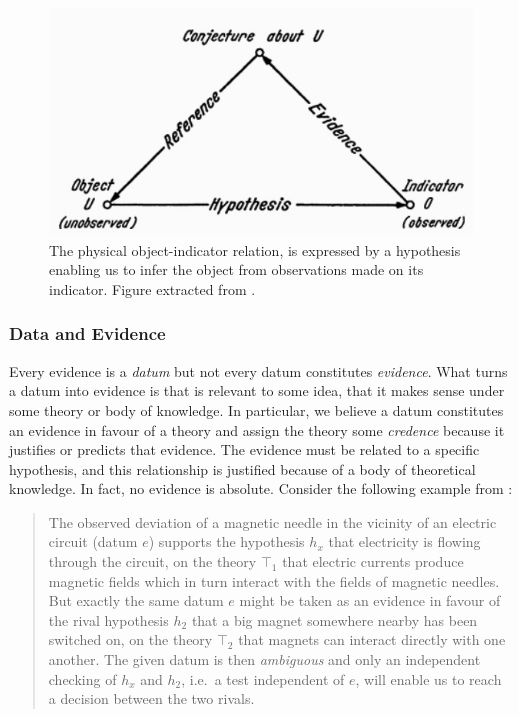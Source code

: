 \documentclass[
]{book}
\begin{document}
\begin{figure}

{\centering \includegraphics[width=0.5\linewidth]{Figures/indicator} 

}

\caption{The physical object-indicator relation, is expressed by a hypothesis enabling us to infer the object from observations made on its indicator. Figure extracted from \citep{bunge2017philosophy}.}\label{fig:indicator}
\end{figure}

\hypertarget{data-and-evidence}{%
\subsubsection{Data and Evidence}\label{data-and-evidence}}

Every evidence is a \emph{datum} but not every datum constitutes \emph{evidence}. What turns a datum into evidence is that is relevant to some idea, that it makes sense under some theory or body of knowledge. In particular, we believe a datum constitutes an evidence in favour of a theory and assign the theory some \emph{credence} because it justifies or predicts that evidence. The evidence must be related to a specific hypothesis, and this relationship is justified because of a body of theoretical knowledge. In fact, no evidence is absolute. Consider the following example from \citep{bunge2017philosophy}:

\begin{quote}
The observed deviation of a magnetic needle in the vicinity of an electric circuit (datum \(e\)) supports the hypothesis \(h_x\) that electricity is flowing through the circuit, on the theory \(⊤_1\) that electric currents produce magnetic fields which in turn interact with the fields of magnetic needles. But exactly the same datum \(e\) might be taken as an evidence in favour of the rival hypothesis \(h_2\) that a big magnet somewhere nearby has been switched on, on the theory \(⊤_2\) that magnets can interact directly with one another. The given datum is then \emph{ambiguous} and only an independent checking of \(h_x\) and \(h_2\), i.e.~a test independent of \(e\), will enable us to reach a decision between the two rivals.
\end{quote}
\end{document}
